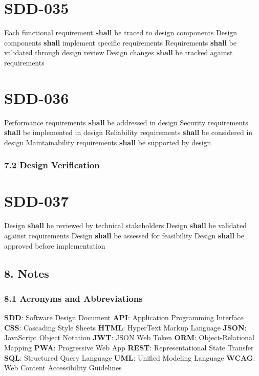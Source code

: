 \section{SDD-035}\label{SDD-035}

Each functional requirement \textbf{shall} be traced to design components
Design components \textbf{shall} implement specific requirements
Requirements \textbf{shall} be validated through design review
Design changes \textbf{shall} be tracked against requirements

\section{SDD-036}\label{SDD-036}

Performance requirements \textbf{shall} be addressed in design
Security requirements \textbf{shall} be implemented in design
Reliability requirements \textbf{shall} be considered in design
Maintainability requirements \textbf{shall} be supported by design

\subsubsection{7.2 Design Verification}

\section{SDD-037}\label{SDD-037}

Design \textbf{shall} be reviewed by technical stakeholders
Design \textbf{shall} be validated against requirements
Design \textbf{shall} be assessed for feasibility
Design \textbf{shall} be approved before implementation

\subsection{8. Notes}

\subsubsection{8.1 Acronyms and Abbreviations}
\textbf{SDD}: Software Design Document
\textbf{API}: Application Programming Interface
\textbf{CSS}: Cascading Style Sheets
\textbf{HTML}: HyperText Markup Language
\textbf{JSON}: JavaScript Object Notation
\textbf{JWT}: JSON Web Token
\textbf{ORM}: Object-Relational Mapping
\textbf{PWA}: Progressive Web App
\textbf{REST}: Representational State Transfer
\textbf{SQL}: Structured Query Language
\textbf{UML}: Unified Modeling Language
\textbf{WCAG}: Web Content Accessibility Guidelines

